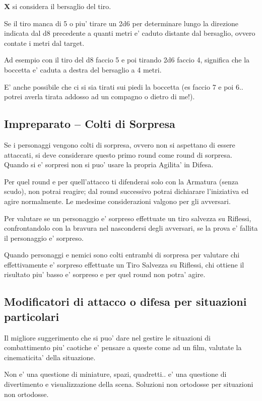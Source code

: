 \documentclass[a4paper,11pt,twoside,openany]{book}
\begin{document}
\textbf{X} si considera il bersaglio del tiro.

Se il tiro manca di 5 o piu' tirare un 2d6 per determinare lungo la direzione indicata dal d8 precedente a quanti metri e' caduto distante dal bersaglio, ovvero contate i metri dal target.

Ad esempio con il tiro del d8 faccio 5 e poi tirando 2d6 faccio 4, significa che la boccetta e' caduta a destra del bersaglio a 4 metri.

E' anche possibile che ci si sia tirati sui piedi la boccetta (es faccio 7 e poi 6.. potrei averla tirata addosso ad un compagno o dietro di me!).

\subsection{Impreparato -- Colti di Sorpresa}

Se i personaggi vengono colti di sorpresa, ovvero non si aspettano di essere attaccati, si deve considerare questo primo round come round di sorpresa. Quando si e' sorpresi non si puo' usare la propria Agilita' in Difesa.

Per quel round e per quell'attacco ti difenderai solo con la Armatura (senza scudo), non potrai reagire; dal round successivo potrai dichiarare l'iniziativa ed agire normalmente. Le medesime considerazioni valgono per gli avversari.

Per valutare se un personaggio e' sorpreso effettuate un tiro salvezza su Riflessi, confrontandolo con la bravura nel nascondersi degli avversari, se la prova e' fallita il personaggio e' sorpreso. 

Quando personaggi e nemici sono colti entrambi di sorpresa per valutare chi effettivamente e' sorpreso effettuate un Tiro Salvezza su Riflessi, chi ottiene il risultato piu' basso e' sorpreso e per quel round non potra' agire.

\subsection{Modificatori di attacco o difesa per situazioni particolari} 

Il migliore suggerimento che si puo' dare nel gestire le situazioni di combattimento piu' caotiche e' pensare a queste come ad un film, valutate la cinematicita' della situazione.

Non e' una questione di miniature, spazi, quadretti.. e' una questione di divertimento e visualizzazione della scena. Soluzioni non ortodosse per situazioni non ortodosse.
\end{document}
